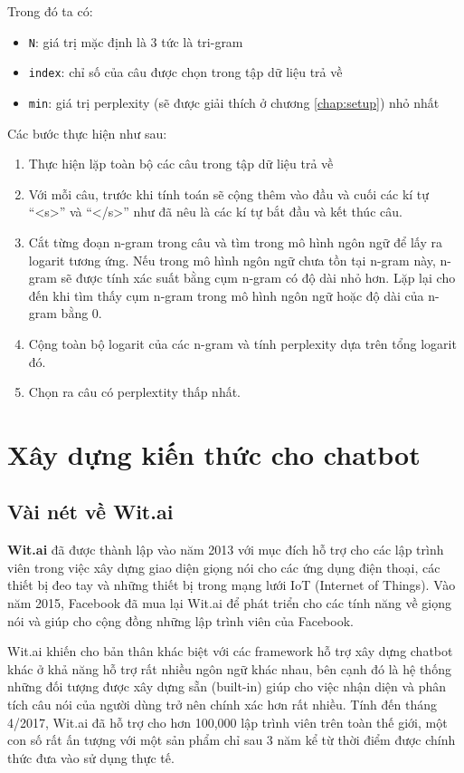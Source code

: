 \documentclass[12pt]{report}
\begin{document}
Trong đó ta có:

\begin{itemize}
	\item \texttt{N}: giá trị mặc định là 3 tức là tri-gram
	\item \texttt{index}: chỉ số của câu được chọn trong tập dữ liệu trả về
	\item \texttt{min}: giá trị perplexity (sẽ được giải thích ở chương \ref{chap:setup}) nhỏ nhất
\end{itemize}

Các bước thực hiện như sau:

\begin{enumerate}
	\item Thực hiện lặp toàn bộ các câu trong tập dữ liệu trả về
	\item Với mỗi câu, trước khi tính toán sẽ cộng thêm vào đầu và cuối các kí tự ``<s>'' và ``</s>'' như đã nêu là các kí tự bắt đầu và kết thúc câu.
	\item Cắt từng đoạn n-gram trong câu và tìm trong mô hình ngôn ngữ để lấy ra logarit tương ứng. Nếu trong mô hình ngôn ngữ chưa tồn tại n-gram này, n-gram sẽ được tính xác suất bằng cụm n-gram có độ dài nhỏ hơn. Lặp lại cho đến khi tìm thấy cụm n-gram trong mô hình ngôn ngữ hoặc độ dài của n-gram bằng 0.
	\item Cộng toàn bộ logarit của các n-gram và tính perplexity dựa trên tổng logarit đó.
	\item Chọn ra câu có perplextity thấp nhất.
\end{enumerate}

\section{Xây dựng kiến thức cho chatbot}

\subsection{Vài nét về Wit.ai}

\textbf{Wit.ai} đã được thành lập vào năm 2013 với mục đích hỗ trợ cho các lập trình viên trong việc xây dựng giao diện giọng nói cho các ứng dụng điện thoại, các thiết bị đeo tay và những thiết bị trong mạng lưới IoT (Internet of Things). Vào năm 2015, Facebook đã mua lại Wit.ai để phát triển cho các tính năng về giọng nói và giúp cho cộng đồng những lập trình viên của Facebook\cite{facebook-wit}.

Wit.ai khiến cho bản thân khác biệt với các framework hỗ trợ xây dựng chatbot khác ở khả năng hỗ trợ rất nhiều ngôn ngữ khác nhau, bên cạnh đó là hệ thống những đối tượng được xây dựng sẵn (built-in) giúp cho việc nhận diện và phân tích câu nói của người dùng trở nên chính xác hơn rất nhiều. Tính đến tháng 4/2017, Wit.ai đã hỗ trợ cho hơn 100,000 lập trình viên trên toàn thế giới, một con số rất ấn tượng với một sản phẩm chỉ sau 3 năm kể từ thời điểm được chính thức đưa vào sử dụng thực tế.
\end{document}

